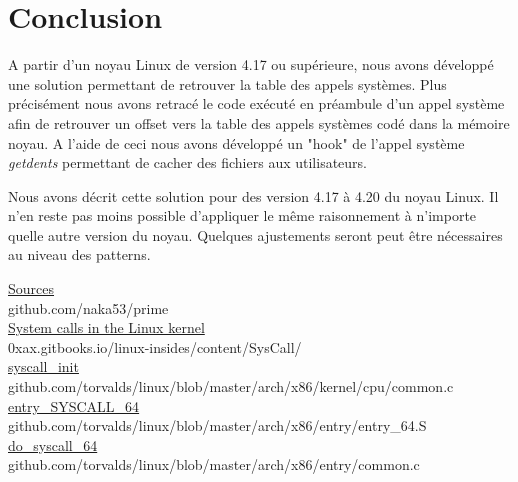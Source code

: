 \documentclass[journal, a4paper]{IEEEtran}
\begin{document}
\section{Conclusion}

A partir d'un noyau Linux de version 4.17 ou supérieure, nous avons développé une solution permettant de retrouver la table des appels systèmes. Plus précisément nous avons retracé le code exécuté en préambule d'un appel système afin de retrouver un offset vers la table des appels systèmes codé dans la mémoire noyau. A l'aide de ceci nous avons développé un "hook" de l'appel système \textit{getdents} permettant de cacher des fichiers aux utilisateurs.

Nous avons décrit cette solution pour des version 4.17 à 4.20 du noyau Linux. Il n'en reste pas moins possible d'appliquer le même raisonnement à n'importe quelle autre version du noyau. Quelques ajustements seront peut être nécessaires au niveau des patterns.

\begin{thebibliography}{}
	\href{https://github.com/naka53/prime}{Sources}\\
	github.com/naka53/prime\\

	\href{https://0xax.gitbooks.io/linux-insides/content/SysCall/}{System calls in the Linux kernel}\\
	0xax.gitbooks.io/linux-insides/content/SysCall/\\

	\href{https://github.com/torvalds/linux/blob/master/arch/x86/kernel/cpu/common.c}{syscall\_init}\\
	github.com/torvalds/linux/blob/master/arch/x86/kernel/cpu/common.c\\

	\href{https://github.com/torvalds/linux/blob/master/arch/x86/entry/entry_64.S}{entry\_SYSCALL\_64}\\
	github.com/torvalds/linux/blob/master/arch/x86/entry/entry\_64.S\\

	\href{https://github.com/torvalds/linux/blob/master/arch/x86/entry/common.c}{do\_syscall\_64}\\
	github.com/torvalds/linux/blob/master/arch/x86/entry/common.c\\
\end{thebibliography}
\end{document}
